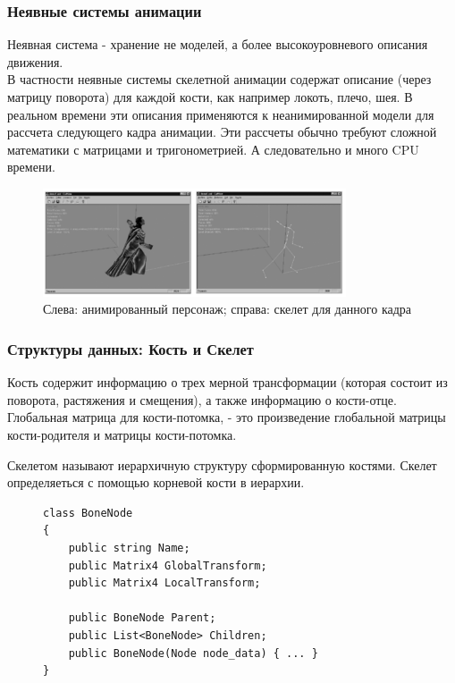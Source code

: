 \documentclass{beamer}
\begin{document}
  
\begin{frame}
\frametitle{Неявные системы анимации}
\begin{scriptsize}
    Неявная система - хранение не моделей, а более высокоуровневого описания движения. \\
    В частности неявные \alert{системы скелетной анимации} содержат описание (через матрицу поворота) для каждой кости, как например локоть, плечо, шея. В реальном времени эти описания применяются к неанимированной модели для рассчета следующего кадра анимации. Эти рассчеты обычно требуют сложной математики с матрицами и тригонометрией. А следовательно и много CPU времени.
    
\begin{figure}[h!]
    \centering
    \includegraphics[width=0.8\textwidth]{implicit_animation.png}
    \caption{\scriptsize{Слева: анимированный персонаж; справа: скелет для данного кадра}}
\end{figure}

\end{scriptsize}
\end{frame}


  
\begin{frame}[fragile]
\frametitle{Структуры данных: Кость и Скелет}
\alert{Кость} содержит информацию о трех мерной трансформации (которая состоит из поворота, растяжения и смещения), а также информацию о кости-отце. Глобальная матрица для кости-потомка, - это произведение глобальной матрицы кости-родителя и матрицы кости-потомка. 

\medskip

\alert{Скелетом} называют иерархичную структуру сформированную костями. Скелет определяеться с помощью корневой кости в иерархии.

\begin{scriptsize}
\begin{figure}[h!]
\begin{verbatim}
class BoneNode
{
    public string Name;
    public Matrix4 GlobalTransform;
    public Matrix4 LocalTransform;

    public BoneNode Parent;
    public List<BoneNode> Children;
    public BoneNode(Node node_data) { ... }
}
\end{verbatim}
\end{figure}
\end{scriptsize}

\end{frame}
\end{document}
